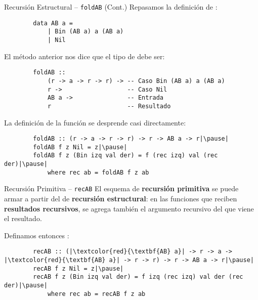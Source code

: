 \begin{frame}[fragile]{Recursión Estructural -- \texttt{foldAB} (Cont.)}
    Repasamos la definición de :

    \begin{verbatim}
        data AB a =
            | Bin (AB a) a (AB a)
            | Nil
    \end{verbatim}

    \pause

    El método anterior nos dice que el tipo de  debe ser:

    \begin{verbatim}
        foldAB ::
            (r -> a -> r -> r) -> -- Caso Bin (AB a) a (AB a)
            r ->                  -- Caso Nil
            AB a ->               -- Entrada
            r                     -- Resultado
    \end{verbatim}

    \pause

    La definición de la función se desprende casi directamente:
    \begin{verbatim}
        foldAB :: (r -> a -> r -> r) -> r -> AB a -> r|\pause|
        foldAB f z Nil = z|\pause|
        foldAB f z (Bin izq val der) = f (rec izq) val (rec der)|\pause|
            where rec ab = foldAB f z ab
    \end{verbatim}
\end{frame}

\begin{frame}[fragile]{Recursión Primitiva -- \texttt{recAB}}
    El esquema de \textbf{recursión primitiva} se puede armar a partir del de \textbf{recursión estructural}: en las funciones que reciben \textbf{resultados recursivos}, se agrega también el argumento recursivo del que viene el resultado.

    \pause

    Definamos entonces :

    \pause
    
    \begin{verbatim}
        recAB :: (|\textcolor{red}{\textbf{AB} a}| -> r -> a -> |\textcolor{red}{\textbf{AB} a}| -> r -> r) -> r -> AB a -> r|\pause|
        recAB f z Nil = z|\pause|
        recAB f z (Bin izq val der) = f izq (rec izq) val der (rec der)|\pause|
            where rec ab = recAB f z ab
    \end{verbatim}
\end{frame}
